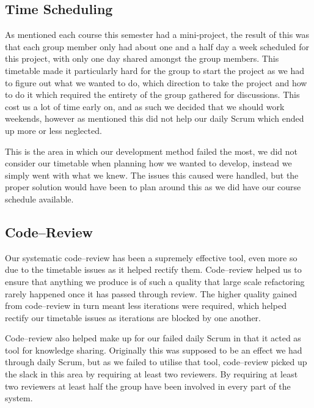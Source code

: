 \subsection{Time Scheduling}\label{sub:time_scheduling}
As mentioned each course this semester had a mini-project, the result of this was that each group member only had about one and a half day a week scheduled for this project, with only one day shared amongst the group members.
This timetable made it particularly hard for the group to start the project as we had to figure out what we wanted to do, which direction to take the project and how to do it which required the entirety of the group gathered for discussions.
This cost us a lot of time early on, and as such we decided that we should work weekends, however as mentioned this did not help our daily Scrum which ended up more or less neglected.

This is the area in which our development method failed the most, we did not consider our timetable when planning how we wanted to develop, instead we simply went with what we knew.
The issues this caused were handled, but the proper solution would have been to plan around this as we did have our course schedule available.

\subsection{Code--Review}
Our systematic code--review has been a supremely effective tool, even more so due to the timetable issues as it helped rectify them.
Code--review helped us to ensure that anything we produce is of such a quality that large scale refactoring rarely happened once it has passed through review.
The higher quality gained from code--review in turn meant less iterations were required, which helped rectify our timetable issues as iterations are blocked by one another.

Code--review also helped make up for our failed daily Scrum in that it acted as tool for knowledge sharing.
Originally this was supposed to be an effect we had through daily Scrum, but as we failed to utilise that tool, code--review picked up the slack in this area by requiring at least two reviewers.
By requiring at least two reviewers at least half the group have been involved in every part of the system.

